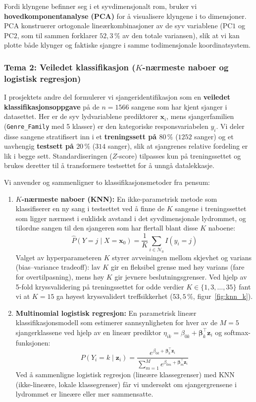 Fordi klyngene befinner seg i et syvdimensjonalt rom, bruker vi \textbf{hovedkomponentanalyse (PCA)} for å visualisere klyngene i to dimensjoner. PCA konstruerer ortogonale lineærkombinasjoner av de syv variablene ($\text{PC1}$ og $\text{PC2}$, som til sammen forklarer $52{,}3\,\%$ av den totale variansen), slik at vi kan plotte både klynger og faktiske sjangre i samme todimensjonale koordinatsystem.

\subsubsection{Tema 2: Veiledet klassifikasjon ($K$-nærmeste naboer og logistisk regresjon)}
I prosjektets andre del formulerer vi sjangeridentifikasjon som en \textbf{veiledet klassifikasjonsoppgave} på de $n = 1566$ sangene som har kjent sjanger i datasettet. Her er de syv lydvariablene prediktorer $\mathbf{x}_i$, mens sjangerfamilien (\texttt{Genre\_Family} med 5 klasser) er den kategoriske responsvariabelen $y_i$. Vi deler disse sangene stratifisert inn i et \textbf{treningssett på $80\,\%$} ($1252$ sanger) og et uavhengig \textbf{testsett på $20\,\%$} ($314$ sanger), slik at sjangrenes relative fordeling er lik i begge sett. Standardiseringen ($Z$-score) tilpasses kun på treningssettet og brukes deretter til å transformere testsettet for å unngå datalekkasje.

Vi anvender og sammenligner to klassifikasjonsmetoder fra pensum:
\begin{enumerate}
\tightlist
\item
  \textbf{$K$-nærmeste naboer (KNN):} En ikke-parametrisk metode som klassifiserer en ny sang i testsettet ved å finne de $K$ sangene i treningssettet som ligger nærmest i euklidsk avstand i det syvdimensjonale lydrommet, og tilordne sangen til den sjangeren som har flertall blant disse $K$ naboene:
  \[
  \hat{P}(Y = j \mid X = \mathbf{x}_0) = \frac{1}{K} \sum_{i \in \mathcal{N}_0} I(y_i = j)
  \]
  Valget av hyperparameteren $K$ styrer avveiningen mellom skjevhet og varians (bias--variance tradeoff): lav $K$ gir en fleksibel grense med høy varians (fare for overtilpasning), mens høy $K$ gir jevnere beslutningsgrenser. Ved hjelp av 5-fold kryssvalidering på treningssettet for odde verdier $K \in \{1, 3, \dots, 35\}$ fant vi at $K = 15$ ga høyest kryssvalidert treffsikkerhet ($53{,}5\,\%$, figur~\ref{fig:knn_k}).
\item
  \textbf{Multinomial logistisk regresjon:} En parametrisk lineær klassifikasjonsmodell som estimerer sannsynligheten for hver av de $M = 5$ sjangerklassene ved hjelp av en lineær prediktor $\eta_{ik} = \beta_{0k} + \boldsymbol{\beta}_k^\top \mathbf{z}_i$ og softmax-funksjonen:
  \[
  P(Y_i = k \mid \mathbf{z}_i) = \frac{e^{\beta_{0k} + \boldsymbol{\beta}_k^\top \mathbf{z}_i}}{\sum_{m=1}^{M} e^{\beta_{0m} + \boldsymbol{\beta}_m^\top \mathbf{z}_i}}
  \]
  Ved å sammenligne logistisk regresjon (lineære klassegrenser) med KNN (ikke-lineære, lokale klassegrenser) får vi undersøkt om sjangergrensene i lydrommet er lineære eller mer sammensatte.
\end{enumerate}

